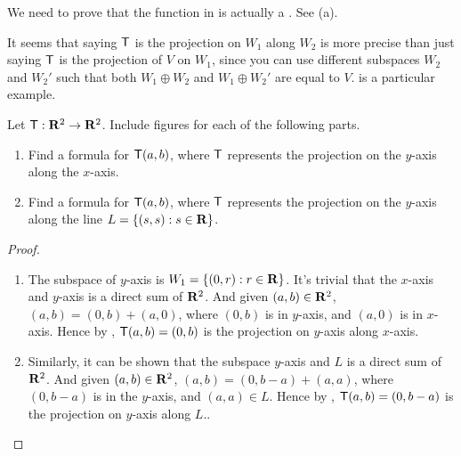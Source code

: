 \begin{note}
We need to prove that the function in  is actually a \LTRAN{}.
See (a).
\end{note}

\begin{note}
It seems that saying \(\textsf{T}\) is the projection on \(W_1\) along \(W_2\) is more precise than just saying \(\textsf{T}\) is the projection of \(V\) on \(W_1\), since you can use different subspaces \(W_2\) and \(W_2'\) such that both \(W_1 \oplus W_2\) and \(W_1 \oplus W_2'\) are equal to \(V\).
 is a particular example.
\end{note}

\begin{exercise} \label{exercise 2.1.25}
Let \(\textsf{T} : \mathbf{R}^2 \to \mathbf{R}^2\).
Include figures for each of the following parts.
\begin{enumerate}
\item Find a formula for \(\textsf{T}(a, b)\), where \(\textsf{T}\) represents the projection on the \(y\)-axis along the \(x\)-axis.
\item Find a formula for \(\textsf{T}(a, b)\), where \(\textsf{T}\) represents the projection on the \(y\)-axis along the line \(L = \{(s, s): s \in \mathbf{R} \}\).
\end{enumerate} 
\end{exercise}

\begin{proof} \ 

\begin{enumerate}
\item The subspace of \(y\)-axis is \(W_1 = \{ (0, r) : r \in \mathbf{R} \}\).
    It's trivial that the \(x\)-axis and \(y\)-axis is a direct sum of \(\mathbf{R}^2\).
    And given \((a, b) \in \mathbf{R}^2\), \((a, b) = (0, b) + (a, 0)\), where \((0, b)\) is in \(y\)-axis, and \((a, 0)\) is in \(x\)-axis.
    Hence by , \(\textsf{T}(a, b) = (0, b)\) is the projection on \(y\)-axis along \(x\)-axis.

\item Similarly, it can be shown that the subspace \(y\)-axis and \(L\) is a direct sum of \(\mathbf{R}^2\).
    And given \((a, b) \in \mathbf{R}^2\), \((a, b) = (0, b - a) + (a, a)\), where \((0, b - a)\) is in the \(y\)-axis, and \((a, a) \in L\).
    Hence by , \(\textsf{T}(a, b) = (0, b - a)\) is the projection on \(y\)-axis along \(L\)..
\end{enumerate}
\end{proof}

